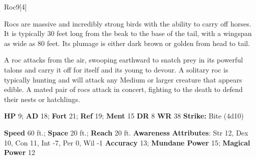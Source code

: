   
  \begin{monsection}{Roc}{9}[4]
    \vspace{-1em}\vspace{-1em}
    \vspace{0em}

    
      Rocs are massive and incredibly strong birds with the ability to carry off horses.
      It is typically 30 feet long from the beak to the base of the tail, with a wingspan as wide as 80 feet.
      Its plumage is either dark brown or golden from head to tail.

      A roc attacks from the air, swooping earthward to snatch prey in its powerful talons and carry it off for itself and its young to devour.
      A solitary roc is typically hunting and will attack any Medium or larger creature that appears edible.
      A mated pair of rocs attack in concert, fighting to the death to defend their nests or hatchlings.
    

    \begin{spellcontent}
      \begin{spelltargetinginfo}
        \pari \textbf{HP} 9;
          \textbf{AD} 18;
          \textbf{Fort} 21;
          \textbf{Ref} 19;
          \textbf{Ment} 15
        \pari \textbf{DR} 8
        \pari \textbf{WR} 38
        \pari \textbf{Strike:}
            Bite  (4d10)
      \end{spelltargetinginfo}
    \end{spellcontent}
    \begin{monsterfooter}
      \pari \textbf{Speed} 60 ft.;
        \textbf{Space} 20 ft.;
        \textbf{Reach} 20 ft.
      \pari \textbf{Awareness} 
      \pari \textbf{Attributes}:
        Str 12, Dex 10,
        Con 11, Int -7,
        Per 0, Wil -1
      \pari \textbf{Accuracy} 13;
        \textbf{Mundane Power} 15;
      \textbf{Magical Power} 12
    \end{monsterfooter}
  \end{monsection}
  
